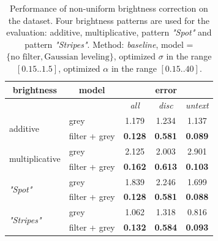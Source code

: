 \begin{table}[ht] \scriptsize
  \centering
  \caption{Performance of non-uniform brightness correction on the \rub dataset. Four brightness patterns are used for the evaluation: additive, multiplicative, pattern \textit{"Spot"} and pattern \textit{"Stripes"}. Method: \textit{baseline}, model = $\lbrace \text{no filter}, \text{Gaussian leveling} \rbrace$, optimized $\sigma$ in the range $[0.15 .. 1.5]$, optimized $\alpha$ in the range $[0.15 .. 40]$.   }
    \begin{tabular}{cccrr}
    \toprule
    \multicolumn{1}{c}{brightness} & model & \multicolumn{3}{c}{error} \\
    \midrule
          & \textit{} & \textit{all} & \multicolumn{1}{c}{\textit{disc}} & \multicolumn{1}{c}{\textit{untext}} \\
          \midrule
          \midrule
    \multicolumn{1}{l}{\multirow{2}[0]{*}{additive}} & \multicolumn{1}{l}{grey}  & 1.179 & \multicolumn{1}{c}{1.234} & \multicolumn{1}{c}{1.137} \\
          & filter + grey & \textbf{0.128} & \multicolumn{1}{c}{\textbf{0.581}} & \multicolumn{1}{c}{\textbf{0.089}} \\
          
          \midrule
          
    \multicolumn{1}{l}{\multirow{2}[0]{*}{multiplicative}} & \multicolumn{1}{l}{grey}  & 2.125 & \multicolumn{1}{c}{2.003} & \multicolumn{1}{c}{2.901} \\
          & filter + grey & \textbf{0.162} & \multicolumn{1}{c}{\textbf{0.613}} & \multicolumn{1}{c}{\textbf{0.103}} \\
          
          \midrule
          
    \multicolumn{1}{l}{\multirow{2}[0]{*}{\textit{"Spot"}}} & \multicolumn{1}{l}{grey}  & 1.839 & \multicolumn{1}{c}{2.246} & \multicolumn{1}{c}{1.699} \\
          & filter + grey & \textbf{0.128} & \multicolumn{1}{c}{\textbf{0.581}} & \multicolumn{1}{c}{\textbf{0.088}} \\
          
          \midrule
          
    \multicolumn{1}{l}{\multirow{2}[0]{*}{\textit{"Stripes"}}} & \multicolumn{1}{l}{grey}  & 1.062 & \multicolumn{1}{c}{1.318} & \multicolumn{1}{c}{0.816} \\
          & filter + grey & \textbf{0.132} & \multicolumn{1}{c}{\textbf{0.584}} & \multicolumn{1}{c}{\textbf{0.093}} \\
    \bottomrule
    \end{tabular}%
  \label{tab:exp_filter_bright}%
\end{table}%

